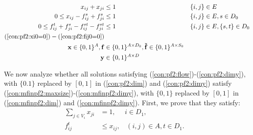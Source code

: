 \begin{small}
\begin{subequations}
\begin{flalign}
		    \label{con:mfinpf2:zbound} x_{ij}+x_{ji}&\leq 1 &&\{i,j\}\in E \\
  		    \label{con:mfinpf2:xbound} 0\leq x_{ij}-f_{ij}^s+f_{ji}^s & \leq 1 && \{i,j\}\in E,  s\in D_0 \\
\label{con:mfinpf2:fbound} 0\leq f_{ij}^t+f_{ji}^s-f_{ij}^{st}-f_{ji}^{st} & \leq 1 && \{i,j\}\in E,\{s,t\}\in D_0 \\
(\ref{con:pf2:xi0=0}) - (\ref{con:pf2:fij0=0}) \notag \\ 
		    \label{con:mfinpf2:dim}	\mathbf{x} \in \{0,1\}^{A},\mathbf{f}&\in\{0,1\}^{A \times D_0},\mathbf{\check{f}}\in\{0,1\}^{A\times S_0} \\ 
		    \label{con:mfinpf2:dimy}\mathbf{y}&\in \{0,1\}^{A\times D}
    \end{flalign}
    \end{subequations}  
\end{small}

We now analyze whether all solutions satisfying (\ref{con:pf2:flow})-(\ref{con:pf2:dimy}), with $\{0.1\}$ replaced by $[0,1]$ in (\ref{con:pf2:dim}) and (\ref{con:pf2:dimy}) satisfy (\ref{con:mfinpf2:maxsize})-(\ref{con:mfinpf2:dimy}), with $\{0,1\}$ replaced by $[0,1]$ in (\ref{con:mfinpf2:dim}) and (\ref{con:mfinpf2:dimy}). First, we prove that they satisfy:
\begin{align*}
\sum_{j\in V_i}x_{ji}&=1,~~~~~~ i\in D_1, & \label{eq:sumToD} \tag{A}\\
f_{ij}^t&\leq x_{ij},~~~~ (i,j)\in A, t\in D_1. & \label{eq:fimpx} \tag{B} \\
\end{align*}


